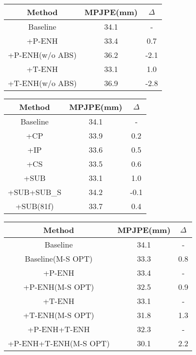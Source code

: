 \documentclass[sigconf]{acmart}
\begin{document}
\begin{multicols}{2}
\begin{center}
    \vspace{0.3cm}
    \begin{tabular}{ccc}

    \toprule
    Method & MPJPE(mm)  & $\Delta$ \\
    \midrule
    Baseline & 34.1&-  \\
    +P-ENH & 33.4&0.7  \\
    +P-ENH(w/o ABS) & 36.2&-2.1  \\
    +T-ENH & 33.1&1.0  \\
    +T-ENH(w/o ABS) & 36.9&-2.8  \\

    \bottomrule
    \end{tabular}
    \vspace{0.5cm}
  \label{tab6}
\end{center}

\begin{center}
\centering
    \begin{tabular}{ccc}
    \toprule
    Method & MPJPE(mm)  & $\Delta$ \\
    \midrule
    Baseline & 34.1&-  \\
    +CP & 33.9&0.2\\
    +IP & 33.6&0.5\\
    +CS & 33.5&0.6\\
    +SUB & 33.1&1.0  \\
    +SUB+SUB\_S & 34.2&-0.1  \\
    +SUB(81f)& 33.7&0.4 \\
    \bottomrule
    \end{tabular}
     \vspace{0.5cm}
  \label{tab5}
\end{center}

\begin{center}
\centering
    \begin{tabular}{ccc}
    \toprule
    Method & MPJPE(mm)  & $\Delta$ \\
    \midrule
    Baseline & 34.1&-  \\
    Baseline(M-S OPT) & 33.3&0.8  \\
    \midrule
    +P-ENH & 33.4&-  \\
    +P-ENH(M-S OPT) & 32.5&0.9  \\
    \midrule
    +T-ENH & 33.1&-  \\
    +T-ENH(M-S OPT) & 31.8&1.3  \\
    \midrule
    +P-ENH+T-ENH &32.3&- \\
    +P-ENH+T-ENH(M-S OPT)&30.1 & 2.2\\
    \bottomrule
    \end{tabular}
    \vspace{0.5cm}
  \label{tab7}
\end{center}


\end{multicols}
\end{document}
